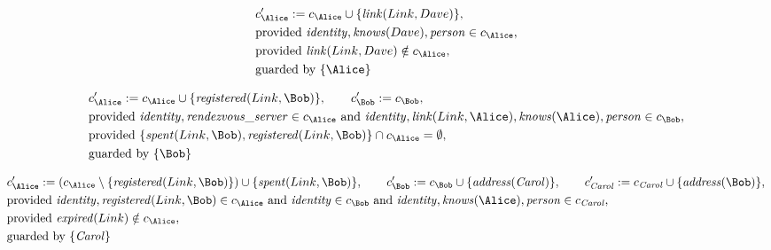 \begin{align*}
&
c'_
{
\Alice
}
 := 
c_
{
\Alice
}
 \cup 
\{
\mathit{\detokenize{
link
}}
(
Link
,
Dave
)
\}
,\\
&
\text{provided } 
\mathit{\detokenize{
identity
}}
,
\mathit{\detokenize{
knows
}}
(
Dave
)
,
\mathit{\detokenize{
person
}}
 \in c_
{
\Alice
}
,\\
&
\text{provided } 
\mathit{\detokenize{
link
}}
(
Link
,
Dave
)
 \notin c_
{
\Alice
}
,\\
&
\text{guarded by } \{
\Alice
\}
\end{align*}

\begin{align*}
&
c'_
{
\Alice
}
 := 
c_
{
\Alice
}
 \cup 
\{
\mathit{\detokenize{
registered
}}
(
Link
,
\Bob
)
\}
, \qquad 
c'_
{
\Bob
}
 := 
c_
{
\Bob
}
,\\
&
\text{provided } 
\mathit{\detokenize{
identity
}}
,
\mathit{\detokenize{
rendezvous_server
}}
 \in c_
{
\Alice
}
 \text{ and } 
\mathit{\detokenize{
identity
}}
,
\mathit{\detokenize{
link
}}
(
Link
,
\Alice
)
,
\mathit{\detokenize{
knows
}}
(
\Alice
)
,
\mathit{\detokenize{
person
}}
 \in c_
{
\Bob
}
,\\
&
\text{provided } 
\{
\mathit{\detokenize{
spent
}}
(
Link
,
\Bob
)
,
\mathit{\detokenize{
registered
}}
(
Link
,
\Bob
)
\}
 \cap c_
{
\Alice
}
 = \emptyset
,\\
&
\text{guarded by } \{
\Bob
\}
\end{align*}

\begin{align*}
&
c'_
{
\Alice
}
 := 
(c_
{
\Alice
}
 \setminus 
\{
\mathit{\detokenize{
registered
}}
(
Link
,
\Bob
)
\}
) \cup 
\{
\mathit{\detokenize{
spent
}}
(
Link
,
\Bob
)
\}
, \qquad 
c'_
{
\Bob
}
 := 
c_
{
\Bob
}
 \cup 
\{
\mathit{\detokenize{
address
}}
(
\mathit{Carol}
)
\}
, \qquad 
c'_
{
\mathit{Carol}
}
 := 
c_
{
\mathit{Carol}
}
 \cup 
\{
\mathit{\detokenize{
address
}}
(
\Bob
)
\}
,\\
&
\text{provided } 
\mathit{\detokenize{
identity
}}
,
\mathit{\detokenize{
registered
}}
(
Link
,
\Bob
)
 \in c_
{
\Alice
}
 \text{ and } 
\mathit{\detokenize{
identity
}}
 \in c_
{
\Bob
}
 \text{ and } 
\mathit{\detokenize{
identity
}}
,
\mathit{\detokenize{
knows
}}
(
\Alice
)
,
\mathit{\detokenize{
person
}}
 \in c_
{
\mathit{Carol}
}
,\\
&
\text{provided } 
\mathit{\detokenize{
expired
}}
(
Link
)
 \notin c_
{
\Alice
}
,\\
&
\text{guarded by } \{
\mathit{Carol}
\}
\end{align*}
